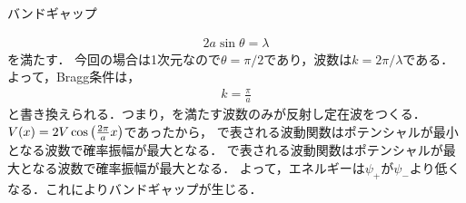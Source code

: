 \documentclass{report}
\begin{document}
\begin{myex}{バンドギャップ}{}
\begin{enumerate}
      \begin{align}
        2a\sin\theta = \lambda
      \end{align}
      を満たす．
      今回の場合は1次元なので$\theta = \pi/2$であり，波数は$k = 2\pi/\lambda$である．よって，Bragg条件は，
      \begin{align}
        k = \frac{\pi}{a}\label{1d-bragg-k-condition}
      \end{align}
      と書き換えられる．つまり，を満たす波数のみが反射し定在波をつくる．$V(x) = 2V\cos\qty(\frac{2\pi}{a}x)$であったから，
      で表される波動関数はポテンシャルが最小となる波数で確率振幅が最大となる．
      で表される波動関数はポテンシャルが最大となる波数で確率振幅が最大となる．
      よって，エネルギーは$\psi_+$が$\psi_-$より低くなる．これによりバンドギャップが生じる．
  \end{enumerate}
  \end{myex}
\end{document}
